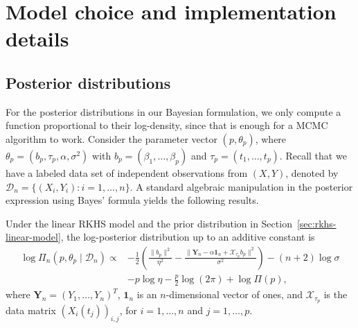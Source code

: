 %
%



\section{Model choice and implementation details}\label{app:model-choice}

\subsection{Posterior distributions}\label{app:posterior}

For the posterior distributions in our Bayesian formulation, we only compute a function proportional to their log-density, since that is enough for a MCMC algorithm to work. Consider the parameter vector \((p, \theta_p)\), where \(\theta_p=(b_p, \tau_p, \alpha, \sigma^2)\) with \(b_p=(\beta_1, \dots, \beta_p)\) and \(\tau_p = (t_1,\dots, t_p)\). Recall that we have a labeled data set of independent observations from \((X, Y)\), denoted by \(\mathcal D_n =\{(X_i, Y_i): i=1,\dots, n\}\). A standard algebraic manipulation in the posterior expression using Bayes' formula yields the following results.

\begin{proposition} Under the linear RKHS model and the prior distribution in Section~\ref{sec:rkhs-linear-model}, the log-posterior distribution up to an additive constant is
  \begin{align*}
  \log\Pi_n(p, \theta_p\mid \mathcal D_n) \propto {} & -\frac{1}{2}\left(\frac{\|b_p\|^2}{\eta^2} - \frac{\|\bm{Y}_n - \alpha\bm{1}_n + \mathcal X_{\tau_p} b_p\|^2}{\sigma^2} \right) - (n+2)\log \sigma\\
  &- p\log \eta - \frac{p}{2}\log(2\pi) + \log \Pi(p),
  \end{align*}
  where \(\bm Y_n=(Y_1,\dots,Y_n)^T\), \(\bm{1}_n\) is an \(n\)-dimensional vector of ones, and \(\mathcal X_{\tau_p}\) is the data matrix \((X_i(t_j))_{i,j}\), for \(i=1,\dots,n\) and \(j=1,\dots,p\).
\end{proposition}

